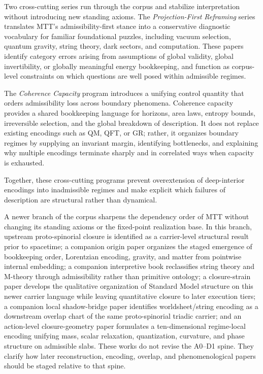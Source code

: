 \documentclass[11pt]{article}
\begin{document}
Two cross-cutting series run through the corpus and stabilize interpretation without introducing
new standing axioms. The \emph{Projection-First Reframing} series translates MTT’s admissibility-first
stance into a conservative diagnostic vocabulary for familiar foundational puzzles, including
vacuum selection, quantum gravity, string theory, dark sectors, and computation. These papers
identify category errors arising from assumptions of global validity, global invertibility, or
globally meaningful energy bookkeeping, and function as corpus-level constraints on which
questions are well posed within admissible regimes.

The \emph{Coherence Capacity} program introduces a unifying control quantity that orders
admissibility loss across boundary phenomena. Coherence capacity provides a shared bookkeeping
language for horizons, area laws, entropy bounds, irreversible selection, and the global breakdown
of description. It does not replace existing encodings such as QM, QFT, or GR; rather, it organizes
boundary regimes by supplying an invariant margin, identifying bottlenecks, and explaining why
multiple encodings terminate sharply and in correlated ways when capacity is exhausted.

Together, these cross-cutting programs prevent overextension of deep-interior encodings into
inadmissible regimes and make explicit which failures of description are structural rather than
dynamical.

A newer branch of the corpus sharpens the dependency order of MTT without changing its
standing axioms or the fixed-point realization base. In this branch, upstream proto-spinorial
closure is identified as a carrier-level structural result prior to spacetime; a companion origin
paper organizes the staged emergence of bookkeeping order, Lorentzian encoding, gravity, and
matter from pointwise internal embedding; a companion interpretive book reclassifies string
theory and M-theory through admissibility rather than primitive ontology; a closure-strain
paper develops the qualitative organization of Standard Model structure on this newer carrier
language while leaving quantitative closure to later execution tiers; a companion local
shadow-bridge paper identifies worldsheet/string encoding as a downstream overlap chart of
the same proto-spinorial triadic carrier; and an action-level closure-geometry paper formulates
a ten-dimensional regime-local encoding unifying mass, scalar relaxation, quantization,
curvature, and phase structure on admissible slabs. These works do not revise the A0--D1
spine. They clarify how later reconstruction, encoding, overlap, and phenomenological papers
should be staged relative to that spine.
\end{document}
